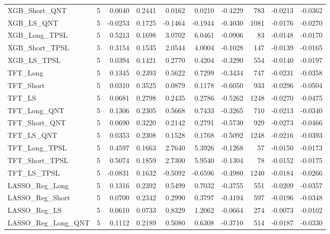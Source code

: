 \begin{tabular}{llrrrrrrrr}
\cline{1-10}
XGB\_Short\_QNT & 5 & 0.0040 & 0.2441 & 0.0162 & 0.0210 & -0.4229 & 783 & -0.0213 & -0.0362 \\
\cline{1-10}
XGB\_LS\_QNT & 5 & -0.0253 & 0.1725 & -0.1464 & -0.1944 & -0.4030 & 1081 & -0.0176 & -0.0270 \\
\cline{1-10}
XGB\_Long\_TPSL & 5 & 0.5213 & 0.1698 & 3.0702 & 6.0461 & -0.0906 & 83 & -0.0148 & -0.0170 \\
\cline{1-10}
XGB\_Short\_TPSL & 5 & 0.3154 & 0.1535 & 2.0544 & 4.0004 & -0.1028 & 147 & -0.0139 & -0.0165 \\
\cline{1-10}
XGB\_LS\_TPSL & 5 & 0.0394 & 0.1421 & 0.2770 & 0.4204 & -0.3290 & 554 & -0.0140 & -0.0197 \\
\cline{1-10}
TFT\_Long & 5 & 0.1345 & 0.2393 & 0.5622 & 0.7299 & -0.3434 & 747 & -0.0231 & -0.0358 \\
\cline{1-10}
TFT\_Short & 5 & 0.0310 & 0.3525 & 0.0879 & 0.1178 & -0.6050 & 933 & -0.0296 & -0.0504 \\
\cline{1-10}
TFT\_LS & 5 & 0.0681 & 0.2798 & 0.2435 & 0.2786 & -0.5262 & 1248 & -0.0270 & -0.0475 \\
\cline{1-10}
TFT\_Long\_QNT & 5 & 0.1306 & 0.2305 & 0.5668 & 0.7433 & -0.3265 & 710 & -0.0213 & -0.0340 \\
\cline{1-10}
TFT\_Short\_QNT & 5 & 0.0690 & 0.3220 & 0.2142 & 0.2791 & -0.5730 & 929 & -0.0273 & -0.0466 \\
\cline{1-10}
TFT\_LS\_QNT & 5 & 0.0353 & 0.2308 & 0.1528 & 0.1768 & -0.5092 & 1248 & -0.0216 & -0.0393 \\
\cline{1-10}
TFT\_Long\_TPSL & 5 & 0.4597 & 0.1663 & 2.7640 & 5.3926 & -0.1268 & 57 & -0.0150 & -0.0173 \\
\cline{1-10}
TFT\_Short\_TPSL & 5 & 0.5074 & 0.1859 & 2.7300 & 5.9540 & -0.1304 & 78 & -0.0152 & -0.0175 \\
\cline{1-10}
TFT\_LS\_TPSL & 5 & -0.0831 & 0.1632 & -0.5092 & -0.6596 & -0.4980 & 1240 & -0.0184 & -0.0266 \\
\cline{1-10}
LASSO\_Reg\_Long & 5 & 0.1316 & 0.2392 & 0.5499 & 0.7032 & -0.3755 & 551 & -0.0209 & -0.0357 \\
\cline{1-10}
LASSO\_Reg\_Short & 5 & 0.0700 & 0.2342 & 0.2990 & 0.3797 & -0.4194 & 597 & -0.0196 & -0.0348 \\
\cline{1-10}
LASSO\_Reg\_LS & 5 & 0.0610 & 0.0733 & 0.8329 & 1.2062 & -0.0664 & 274 & -0.0073 & -0.0102 \\
\cline{1-10}
LASSO\_Reg\_Long\_QNT & 5 & 0.1112 & 0.2189 & 0.5080 & 0.6308 & -0.3710 & 514 & -0.0187 & -0.0330 \\

\end{tabular}
